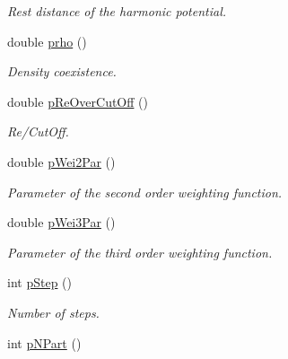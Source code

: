 \begin{DoxyCompactItemize}
\begin{DoxyCompactList}\small\item\em Rest distance of the harmonic potential. \end{DoxyCompactList}\item 
double \hyperlink{classVarData_a9b47d9a32db9326bceac9402c94683d9}{prho} ()\hypertarget{classVarData_a9b47d9a32db9326bceac9402c94683d9}{}\label{classVarData_a9b47d9a32db9326bceac9402c94683d9}

\begin{DoxyCompactList}\small\item\em Density coexistence. \end{DoxyCompactList}\item 
double \hyperlink{classVarData_a71e85d43bc5bd1fcb6563c91a67576b2}{p\+Re\+Over\+Cut\+Off} ()\hypertarget{classVarData_a71e85d43bc5bd1fcb6563c91a67576b2}{}\label{classVarData_a71e85d43bc5bd1fcb6563c91a67576b2}

\begin{DoxyCompactList}\small\item\em Re/\+Cut\+Off. \end{DoxyCompactList}\item 
double \hyperlink{classVarData_a217f00c8faf9ba6bb022913df51e5f24}{p\+Wei2\+Par} ()\hypertarget{classVarData_a217f00c8faf9ba6bb022913df51e5f24}{}\label{classVarData_a217f00c8faf9ba6bb022913df51e5f24}

\begin{DoxyCompactList}\small\item\em Parameter of the second order weighting function. \end{DoxyCompactList}\item 
double \hyperlink{classVarData_aa5c40af319c1dda726271b9fe4059443}{p\+Wei3\+Par} ()\hypertarget{classVarData_aa5c40af319c1dda726271b9fe4059443}{}\label{classVarData_aa5c40af319c1dda726271b9fe4059443}

\begin{DoxyCompactList}\small\item\em Parameter of the third order weighting function. \end{DoxyCompactList}\item 
int \hyperlink{classVarData_acf2e386d659b56caeceb504cd74e90e0}{p\+Step} ()\hypertarget{classVarData_acf2e386d659b56caeceb504cd74e90e0}{}\label{classVarData_acf2e386d659b56caeceb504cd74e90e0}

\begin{DoxyCompactList}\small\item\em Number of steps. \end{DoxyCompactList}\item 
int \hyperlink{classVarData_a388622b5e7d2ad20e8ac1a8a951d655f}{p\+N\+Part} ()\hypertarget{classVarData_a388622b5e7d2ad20e8ac1a8a951d655f}{}\label{classVarData_a388622b5e7d2ad20e8ac1a8a951d655f}


\end{DoxyCompactItemize}
